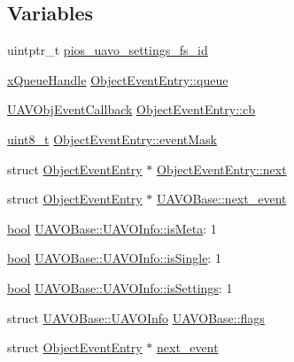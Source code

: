 \subsection*{Variables}
\begin{DoxyCompactItemize}
\item 
uintptr\-\_\-t \hyperlink{group___u_a_v_gab060f441dd600b08386c0ca1b487217a}{pios\-\_\-uavo\-\_\-settings\-\_\-fs\-\_\-id}
\item 
\hyperlink{_common_2_libraries_2_free_r_t_o_s_2_source_2include_2queue_8h_a229037f755b756156e34a440ce134b8b}{x\-Queue\-Handle} \hyperlink{group___u_a_v_ga458a6b3068168aff7f61a922a5011673}{Object\-Event\-Entry\-::queue}
\item 
\hyperlink{group___u_a_v_ga33d11560e38b56dc904220fb0f785c28}{U\-A\-V\-Obj\-Event\-Callback} \hyperlink{group___u_a_v_ga202f15e5d4be2ca706b2f9ed6fa27d81}{Object\-Event\-Entry\-::cb}
\item 
\hyperlink{stdint_8h_aba7bc1797add20fe3efdf37ced1182c5}{uint8\-\_\-t} \hyperlink{group___u_a_v_ga7943bff77f5f644659a1cb59d7f0b176}{Object\-Event\-Entry\-::event\-Mask}
\item 
struct \hyperlink{struct_object_event_entry}{Object\-Event\-Entry} $\ast$ \hyperlink{group___u_a_v_gaf10cb19d61193416975d2cb2c78bf620}{Object\-Event\-Entry\-::next}
\item 
struct \hyperlink{struct_object_event_entry}{Object\-Event\-Entry} $\ast$ \hyperlink{group___u_a_v_gaa0d6ea1fcd5ae56953e8dd7f244dd988}{U\-A\-V\-O\-Base\-::next\-\_\-event}
\item 
\hyperlink{group___exported__types_gaf6a258d8f3ee5206d682d799316314b1}{bool} \hyperlink{group___u_a_v_ga5358cdae3a703bf0ad8b1bb4fc19d1ca}{U\-A\-V\-O\-Base\-::\-U\-A\-V\-O\-Info\-::is\-Meta}\-: 1
\item 
\hyperlink{group___exported__types_gaf6a258d8f3ee5206d682d799316314b1}{bool} \hyperlink{group___u_a_v_ga2ac5c0e20d294c304f14e18fd2fdc61a}{U\-A\-V\-O\-Base\-::\-U\-A\-V\-O\-Info\-::is\-Single}\-: 1
\item 
\hyperlink{group___exported__types_gaf6a258d8f3ee5206d682d799316314b1}{bool} \hyperlink{group___u_a_v_ga24c38e3db94c7b88d4dd0cfdd2736b4d}{U\-A\-V\-O\-Base\-::\-U\-A\-V\-O\-Info\-::is\-Settings}\-: 1
\item 
struct \hyperlink{struct_u_a_v_o_base_1_1_u_a_v_o_info}{U\-A\-V\-O\-Base\-::\-U\-A\-V\-O\-Info} \hyperlink{group___u_a_v_ga613d564f9ee891c00dba4e3fe6277193}{U\-A\-V\-O\-Base\-::flags}
\item 
struct \hyperlink{struct_object_event_entry}{Object\-Event\-Entry} $\ast$ \hyperlink{group___u_a_v_ga198dfe31641d68ac23d11a5f98b07ac1}{next\-\_\-event}

\end{DoxyCompactItemize}
